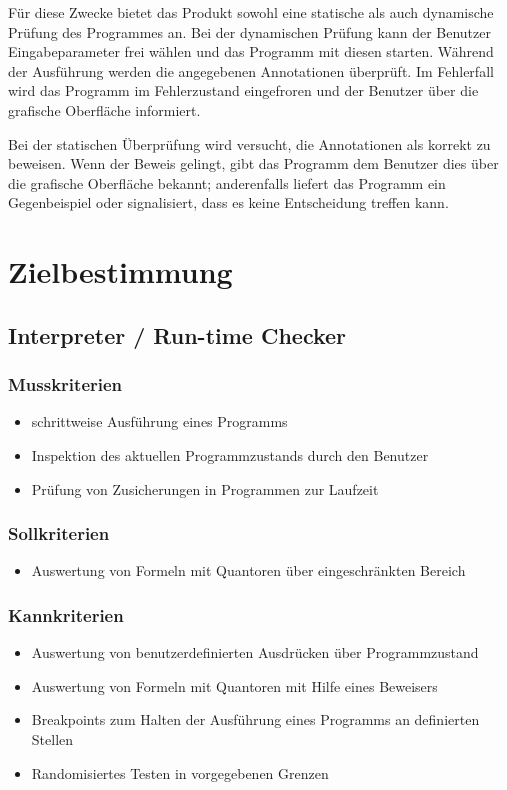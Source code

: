 \documentclass[a4paper,10pt]{article}
\begin{document}
F\"{u}r diese Zwecke bietet das Produkt sowohl eine statische als auch dynamische Pr\"{u}fung des Programmes an. Bei der dynamischen Pr\"{u}fung kann der Benutzer Eingabeparameter frei w\"{a}hlen und das Programm mit diesen starten. W\"{a}hrend der Ausf\"{u}hrung werden die angegebenen Annotationen \"{u}berpr\"{u}ft. Im Fehlerfall wird das Programm im Fehlerzustand eingefroren und der Benutzer \"{u}ber die grafische Oberfl\"{a}che informiert.

Bei der statischen \"{U}berpr\"{u}fung wird versucht, die Annotationen als korrekt zu beweisen. Wenn der Beweis gelingt, gibt das Programm dem Benutzer dies \"{u}ber die grafische Oberfl\"{a}che bekannt; anderenfalls liefert das Programm ein Gegenbeispiel oder signalisiert, dass es keine Entscheidung treffen kann.

\section{Zielbestimmung}
\subsection{Interpreter / Run-time Checker}
\subsubsection{Musskriterien}
\begin{itemize}
  \item schrittweise Ausf\"{u}hrung eines Programms
  \item Inspektion des aktuellen Programmzustands durch den Benutzer
  \item Pr\"{u}fung von Zusicherungen in Programmen zur Laufzeit
\end{itemize}
\subsubsection{Sollkriterien}
\begin{itemize}
  \item Auswertung von Formeln mit Quantoren \"{u}ber eingeschr\"{a}nkten Bereich
\end{itemize}
\subsubsection{Kannkriterien}
\begin{itemize}
  \item Auswertung von benutzerdefinierten Ausdr\"{u}cken \"{u}ber Programmzustand
  \item Auswertung von Formeln mit Quantoren mit Hilfe eines Beweisers
  \item Breakpoints zum Halten der Ausf\"{u}hrung eines Programms an definierten Stellen
  \item Randomisiertes Testen in vorgegebenen Grenzen
\end{itemize}
\end{document}
